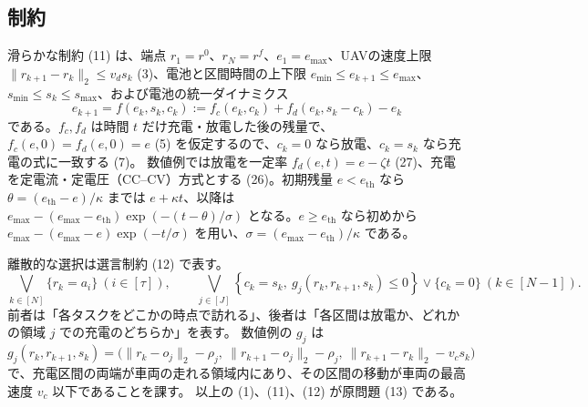 \documentclass[uplatex,dvipdfmx,a4paper,11pt,jafont=haranoaji]{bxjsarticle}
\newcommand{\answerpart}[1]{\par\Needspace{6\baselineskip}\subsection*{#1}}
\newcommand{\norm}[1]{\lVert #1\rVert_2}
\begin{document}
\answerpart{制約}
滑らかな制約 (11) は、端点 $r_1=r^0$、$r_N=r^f$、$e_1=e_{\max}$、UAVの速度上限 $\norm{r_{k+1}-r_k}\le v_ds_k$ (3)、電池と区間時間の上下限 $e_{\min}\le e_{k+1}\le e_{\max}$、$s_{\min}\le s_k\le s_{\max}$、および電池の統一ダイナミクス
\begin{equation*}
  e_{k+1}=f(e_k,s_k,c_k):=f_c(e_k,c_k)+f_d(e_k,s_k-c_k)-e_k \tag{6}
\end{equation*}
である。$f_c,f_d$ は時間 $t$ だけ充電・放電した後の残量で、$f_c(e,0)=f_d(e,0)=e$ (5) を仮定するので、$c_k=0$ なら放電、$c_k=s_k$ なら充電の式に一致する (7)。
数値例では放電を一定率 $f_d(e,t)=e-\zeta t$ (27)、充電を定電流・定電圧（CC--CV）方式とする (26)。初期残量 $e<e_{\mathrm{th}}$ なら $\theta=(e_{\mathrm{th}}-e)/\kappa$ までは $e+\kappa t$、以降は $e_{\max}-(e_{\max}-e_{\mathrm{th}})\exp(-(t-\theta)/\sigma)$ となる。$e\ge e_{\mathrm{th}}$ なら初めから $e_{\max}-(e_{\max}-e)\exp(-t/\sigma)$ を用い、$\sigma=(e_{\max}-e_{\mathrm{th}})/\kappa$ である。

離散的な選択は選言制約 (12) で表す。
\begin{equation*}
  \bigvee_{k\in[N]}\{r_k=a_i\}\ (i\in[\tau]),\qquad
  \bigvee_{j\in[J]}\left\{c_k=s_k,\ g_j(r_k,r_{k+1},s_k)\le0\right\}\vee\{c_k=0\}\ (k\in[N-1]). \tag{12}
\end{equation*}
前者は「各タスクをどこかの時点で訪れる」、後者は「各区間は放電か、どれかの領域 $j$ での充電のどちらか」を表す。
数値例の $g_j$ は
\begin{equation*}
  g_j(r_k,r_{k+1},s_k)=\bigl(\norm{r_k-o_j}-\rho_j,\ \norm{r_{k+1}-o_j}-\rho_j,\ \norm{r_{k+1}-r_k}-v_cs_k\bigr) \tag{24}
\end{equation*}
で、充電区間の両端が車両の走れる領域内にあり、その区間の移動が車両の最高速度 $v_c$ 以下であることを課す。
以上の (1)、(11)、(12) が原問題 (13) である。
\end{document}
